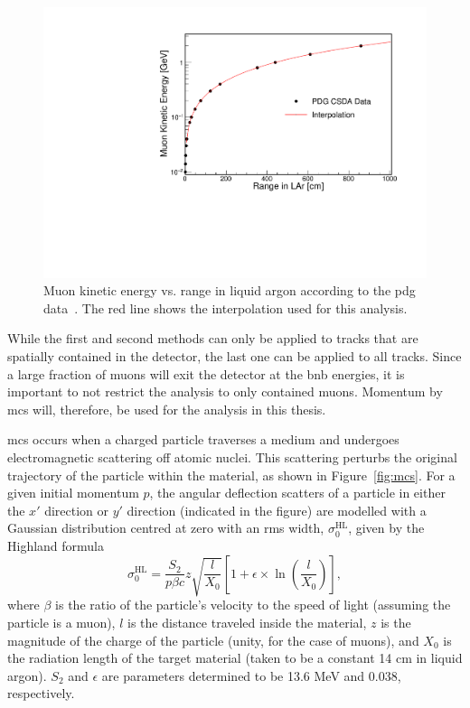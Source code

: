 \begin{figure}[]
\centering
\includegraphics[width=.70\textwidth]{images/Reconstruction/mom_range}
\caption[Muon Kinetic Energy vs. Range]{Muon kinetic energy vs. range in liquid argon according to the \acrlong{pdg} data~\cite{pdg_muon_mom}. The red line shows the interpolation used for this analysis.}
\label{fig:mom_range}
\end{figure}

While the first and second methods can only be applied to tracks that are spatially contained in the detector, the last one can be applied to all tracks. Since a large fraction of muons will exit the detector at the \acrshort{bnb} energies, it is important to not restrict the analysis to only contained muons. Momentum by \acrshort{mcs} will, therefore, be used for the analysis in this thesis. 

\acrshort{mcs} occurs when a charged particle traverses a medium and undergoes electromagnetic scattering off atomic nuclei. This scattering perturbs the original trajectory of the particle within the material, as shown in Figure~\ref{fig:mcs}. For a given initial momentum $p$, the angular deflection scatters of a particle in either the $x'$ direction or $y'$ direction (indicated in the figure) are modelled with a Gaussian distribution centred at zero with an \acrshort{rms} width, $\sigma_0^\text{HL}$, given by the Highland formula~\cite{highland1, highland2}
\begin{equation}
\label{eq:hl}
\sigma_{0}^\text{HL} = \frac{S_2}{p\beta c}z\sqrt{\frac{l}{X_0}} \left[ 1 + \epsilon \times \ln\left(\frac{l}{X_0}\right) \right],
\end{equation}
where $\beta$ is the ratio of the particle's velocity to the speed of light (assuming the particle is a muon), $l$ is the distance traveled inside the material, $z$ is the magnitude of the charge of the particle (unity, for the case of muons), and $X_0$ is the radiation length of the target material (taken to be a constant 14 cm in liquid argon). $S_2$ and $\epsilon$ are parameters determined to be 13.6 MeV and 0.038, respectively.

